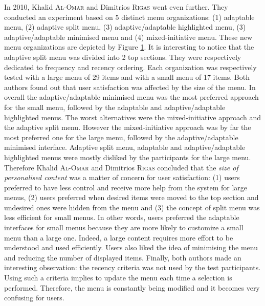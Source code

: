 In 2010, Khalid \textsc{Al-Omar} and Dimitrios \textsc{Rigas} went even 
further. They conducted 
an experiment based on 5 distinct menu organizations: (1) adaptable menu, (2) 
adaptive split menu, (3) adaptive/adaptable highlighted menu, (3) 
adaptive/adaptable minimised menu and (4) mixed-initiative menu. These new menu 
organizations are depicted by Figure \ref{fig:khalid_menus}. It is interesting 
to notice that the adaptive split menu was divided into 2 top sections. They 
were respectively dedicated to frequency and recency ordering. Each 
organization was respectively tested with a large menu of 29 items and with a 
small menu of 17 items. Both authors found out that user satisfaction was 
affected by the size of the menu. In overall the adaptive/adaptable minimised 
menu was the most preferred approach for the small menu, followed by the 
adaptable and adaptive/adaptable highlighted menus. The worst alternatives were 
the mixed-initiative approach and the adaptive split menu. However the 
mixed-initiative approach was by far the most preferred one for the large menu, 
followed by the adaptive/adaptable minimised interface. Adaptive split menu, 
adaptable and adaptive/adaptable highlighted menus were mostly disliked by the 
participants for the large menu. Therefore Khalid \textsc{Al-Omar} and 
Dimitrios \textsc{Rigas} 
concluded that the \textit{size of personalised content} was a matter of 
concern for 
user satisfaction: (1) users preferred to have less control and receive more 
help from the system for large menus, (2) users preferred when desired items 
were moved to the top section and undesired ones were hidden from the menu and 
(3) the concept of split menu was less efficient for small menus. In other 
words, users preferred the adaptable interfaces for small menus because they 
are more likely to customize a small menu than a large one. Indeed, a large 
content requires more effort to be understood and used efficiently. Users also 
liked the idea of minimising the menu and reducing the number of displayed 
items. Finally, both authors made an interesting observation: the recency 
criteria was not used by the test participants. Using such a criteria implies to 
update the menu each time a selection is performed. Therefore, the menu is 
constantly being modified and it becomes very confusing for users.\newline

\begin{figure}[!ht]
    
    \label{fig:khalid_menus}
\end{figure}

